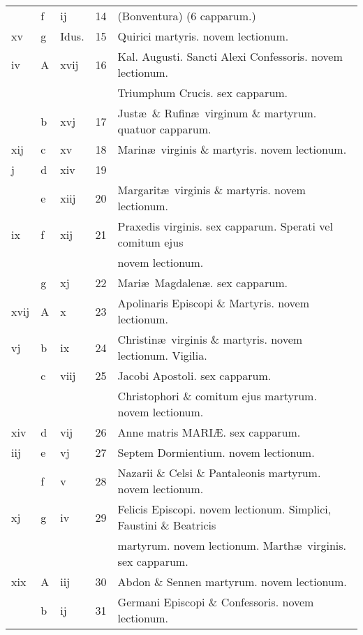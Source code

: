 \documentclass[letter,11pt]{book}
\begin{document}
\begin{center}
\begin{tabular}{l | l | l | r | l}
\color{Red}  & f & \color{Red} ij & 14 & (Bonventura) \color{Red} (6 capparum.) \\
\color{Red} xv & g & Idus. & 15 & Quirici martyris. \color{Red} novem lectionum. \\
\color{Red} iv & \color{Red} A & \color{Red} xvij & 16 & \color{Red} Kal. Augusti. \color{black} Sancti Alexi Confessoris. \color{Red} novem lectionum. \\
 &  &  &  & \quad \color{Red} Triumphum Crucis. \color{black} sex capparum. \\
\color{Red}  & b & \color{Red} xvj & 17 & Just\ae \ \& Rufin\ae \ virginum \& martyrum. \color{Red} quatuor capparum. \\
\color{Red} xij & c & \color{Red} xv & 18 & Marin\ae \ virginis \& martyris. \color{Red} novem lectionum. \\
\color{Red} j & d & \color{Red} xiv & 19 & \\
\color{Red}  & e & \color{Red} xiij & 20 & Margarit\ae \ virginis \& martyris. \color{Red} novem lectionum. \\
\color{Red} ix & f & \color{Red} xij & 21 & Praxedis virginis. \color{Red} sex capparum. \color{black} Sperati vel comitum ejus \\
 &  &  &  & \quad \color{Red} novem lectionum. \\
\color{Red}  & g & \color{Red} xj & 22 & \color{Red} Mari\ae \ Magdalen\ae . \color{black} sex capparum. \\
\color{Red} xvij & \color{Red} A & \color{Red} x & 23 & Apolinaris Episcopi \& Martyris. \color{Red} novem lectionum. \\
\color{Red} vj & b & \color{Red} ix & 24 & Christin\ae \ virginis \& martyris. \color{Red} novem lectionum. \color{black} Vigilia. \\
\color{Red}  & c & \color{Red} viij & 25 & \color{Red} Jacobi Apostoli. \color{black} sex capparum. \\
 &  &  &  & \quad Christophori \& comitum ejus martyrum. \color{Red} novem lectionum. \\
\color{Red} xiv & d & \color{Red} vij & 26 & Anne matris MARI\AE . \color{Red} sex capparum. \\
\color{Red} iij & e & \color{Red} vj & 27 & Septem Dormientium. \color{Red} novem lectionum. \\
\color{Red}  & f & \color{Red} v & 28 & Nazarii \& Celsi \& Pantaleonis martyrum. \color{Red} novem lectionum. \\
\color{Red} xj & g & \color{Red} iv & 29 & Felicis Episcopi. \color{Red} novem lectionum. \color{black} Simplici, Faustini \& Beatricis \\
 &  &  &  & \quad martyrum. \color{Red} novem lectionum. \color{black} Marth\ae \ virginis. \color{Red} sex capparum. \\
\color{Red} xix & \color{Red} A & \color{Red} iij & 30 & Abdon \& Sennen martyrum. \color{Red} novem lectionum. \\
\color{Red}  & b & \color{Red} ij & 31 & Germani Episcopi \& Confessoris. \color{Red} novem lectionum. \\
\end{tabular}
\end{center}
\end{document}

